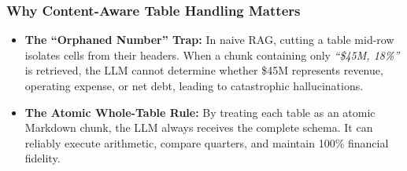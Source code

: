 \documentclass[11pt,a4paper]{article}
\begin{document}
\subsubsection{Why Content-Aware Table Handling Matters}
\begin{itemize}[leftmargin=1.0cm]
\item \textbf{The ``Orphaned Number'' Trap:} In naive RAG, cutting a table mid-row isolates cells from their headers. When a chunk containing only \emph{``\$45M, 18\%''} is retrieved, the LLM cannot determine whether \$45M represents revenue, operating expense, or net debt, leading to catastrophic hallucinations.
\item \textbf{The Atomic Whole-Table Rule:} By treating each table as an atomic Markdown chunk, the LLM always receives the complete schema. It can reliably execute arithmetic, compare quarters, and maintain 100\% financial fidelity.
\end{itemize}
\end{document}
